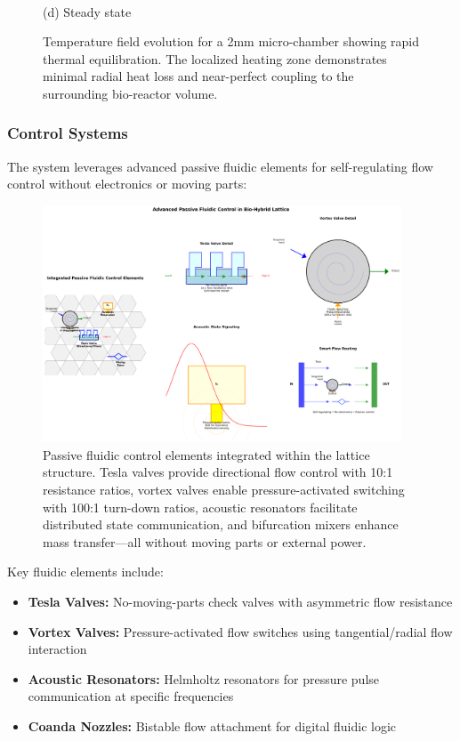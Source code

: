 \begin{figure}[H]
\begin{minipage}{0.48\textwidth}
        \\{\small (d) Steady state}
    \end{minipage}
    \caption{Temperature field evolution for a 2mm micro-chamber showing rapid thermal equilibration. The localized heating zone demonstrates minimal radial heat loss and near-perfect coupling to the surrounding bio-reactor volume.}
    \label{fig:temp_evolution}
\end{figure}

\subsubsection{Control Systems}
The system leverages advanced passive fluidic elements for self-regulating flow control without electronics or moving parts:

\begin{figure}[H]
    \centering
    \includegraphics[width=0.95\textwidth]{figures/simulations/advanced_fluidics_integration.png}
    \caption{Passive fluidic control elements integrated within the lattice structure. Tesla valves provide directional flow control with 10:1 resistance ratios, vortex valves enable pressure-activated switching with 100:1 turn-down ratios, acoustic resonators facilitate distributed state communication, and bifurcation mixers enhance mass transfer—all without moving parts or external power.}
    \label{fig:advanced_fluidics}
\end{figure}

Key fluidic elements include:
\begin{itemize}
    \item \textbf{Tesla Valves:} No-moving-parts check valves with asymmetric flow resistance
    \item \textbf{Vortex Valves:} Pressure-activated flow switches using tangential/radial flow interaction
    \item \textbf{Acoustic Resonators:} Helmholtz resonators for pressure pulse communication at specific frequencies
    \item \textbf{Coanda Nozzles:} Bistable flow attachment for digital fluidic logic
\end{itemize}

